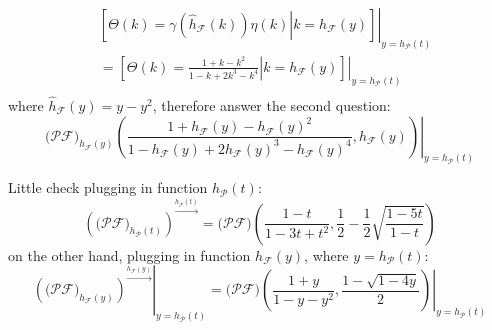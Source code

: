 \begin{displaymath}
    \begin{split}
        &\left.\left[\left.\Theta(k)=\gamma(\hat{h}_{\mathcal{F}}(k))\eta(k) \right| k=h_{\mathcal{F}}(y) \right]\right|_{y=h_{\mathcal{P}}(t)}\\
        &= \left.\left[\left.\Theta(k)=\frac{1+k-k^2}{1-k+ 2k^3 - k^4} \right| k=h_{\mathcal{F}}(y) \right]\right|_{y=h_{\mathcal{P}}(t)}\\
    \end{split}
\end{displaymath}
where $\hat{h}_{\mathcal{F}}(y)=y-y^2$, therefore answer the second question:
\begin{displaymath}
    \left.\big(\mathcal{P}\mathcal{F}\big)_{h_{\mathcal{F}}(y)} \left(
        \frac{1+h_{\mathcal{F}}(y)-h_{\mathcal{F}}(y)^2}{1-h_{\mathcal{F}}(y)+ 2h_{\mathcal{F}}(y)^3 - h_{\mathcal{F}}(y)^4} ,
        h_{\mathcal{F}}(y) \right)\right|_{y=h_{\mathcal{P}}(t)}
\end{displaymath}

Little check plugging in function $h_{\mathcal{P}}(t)$:
\begin{displaymath}
    \left(\big(\mathcal{P}\mathcal{F}\big)_{h_{\mathcal{P}}(t)}\right)^{\stackrel{h_{\mathcal{P}}(t)}{\rightarrow}}
        = \big(\mathcal{P}\mathcal{F}\big)\left(\frac{1-t}{1-3t+t^2}, \frac{1}{2}-\frac{1}{2}\sqrt{\frac{1-5t}{1-t}} \right)
\end{displaymath}
on the other hand, plugging in function $h_{\mathcal{F}}(y)$, where $y=h_{\mathcal{P}}(t)$:
\begin{displaymath}
    \left.\left(\big(\mathcal{P}\mathcal{F}\big)_{h_{\mathcal{F}}(y)}\right)^{\stackrel{h_{\mathcal{F}}(y)}{\rightarrow}}\right|_{y=h_{\mathcal{P}}(t)}
        = \left.\big(\mathcal{P}\mathcal{F}\big)\left(\frac{1+y}{1-y-y^2}, \frac{1-\sqrt{1-4y}}{2} \right)\right|_{y=h_{\mathcal{P}}(t)}
\end{displaymath}
